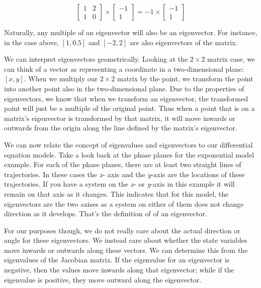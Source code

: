 \documentclass[]{memoir}
\begin{document}
\[\begin{bmatrix} 1 & 2 \\ 1 & 0 \end{bmatrix} \times \begin{bmatrix} -1 \\ 1 \end{bmatrix} = -1 \times \begin{bmatrix} -1 \\ 1 \end{bmatrix}\]

Naturally, any multiple of an eigenvector will also be an eigenvector.
For instance, in the case above, $[1, 0.5]$ and $[-2, 2]$ are also
eigenvectors of the matrix.

We can interpret eigenvectors geometrically. Looking at the $2\times2$
matrix case, we can think of a vector as representing a coordinate in a
two-dimensional plane: $[x,y]$. When we multiply our $2\times2$ matrix
by the point, we transform the point into another point also in the
two-dimensional plane. Due to the properties of eigenvectors, we know
that when we transform an eigenvector, the transformed point will just
be a multiple of the original point. Thus when a point that is on a
matrix's eigenvector is transformed by that matrix, it will move inwards
or outwards from the origin along the line defined by the matrix's
eigenvector.

We can now relate the concept of eigenvalues and eigenvectors to our
differential equation models. Take a look back at the phase planes for
the exponential model example. For each of the phase planes, there are
at least two straight lines of trajectories. In these cases the
\emph{x}- axis and the \emph{y}-axis are the locations of these
trajectories. If you have a system on the \emph{x}- or \emph{y}-axis in
this example it will remain on that axis as it changes. This indicates
that for this model, the eigenvectors are the two axises as a system on
either of them does not change direction as it develops. That's the
definition of of an eigenvector.

For our purposes though, we do not really care about the actual
direction or angle for these eigenvectors. We instead care about whether
the state variables move inwards or outwards along these vectors. We can
determine this from the eigenvalues of the Jacobian matrix. If the
eigenvalue for an eigenvector is negative, then the values move inwards
along that eigenvector; while if the eigenvalue is positive, they move
outward along the eigenvector.
\end{document}
